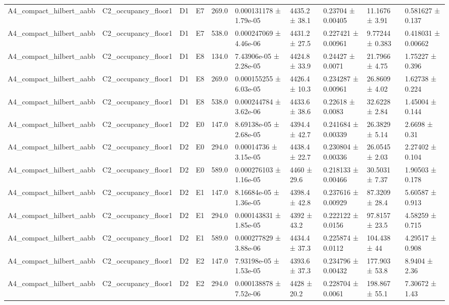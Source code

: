 \begin{table}
\begin{tabular}{llllllllll}
A4\_compact\_hilbert\_aabb & C2\_occupancy\_floor1 & D1 & E7 & 269.0 & 0.000131178 ± 1.79e-05 & 4435.2 ± 38.1 & 0.23704 ± 0.00405 & 11.1676 ± 3.91 & 0.581627 ± 0.137 \\
A4\_compact\_hilbert\_aabb & C2\_occupancy\_floor1 & D1 & E7 & 538.0 & 0.000247069 ± 4.46e-06 & 4431.2 ± 27.5 & 0.227421 ± 0.00961 & 9.77244 ± 0.383 & 0.418031 ± 0.00662 \\
A4\_compact\_hilbert\_aabb & C2\_occupancy\_floor1 & D1 & E8 & 134.0 & 7.43906e-05 ± 2.28e-05 & 4424.8 ± 33.9 & 0.24427 ± 0.0071 & 21.7966 ± 4.75 & 1.75227 ± 0.396 \\
A4\_compact\_hilbert\_aabb & C2\_occupancy\_floor1 & D1 & E8 & 269.0 & 0.000155255 ± 6.03e-05 & 4426.4 ± 10.3 & 0.234287 ± 0.00961 & 26.8609 ± 4.02 & 1.62738 ± 0.224 \\
A4\_compact\_hilbert\_aabb & C2\_occupancy\_floor1 & D1 & E8 & 538.0 & 0.000244784 ± 3.62e-06 & 4433.6 ± 38.6 & 0.22618 ± 0.0083 & 32.6228 ± 2.84 & 1.45004 ± 0.144 \\
A4\_compact\_hilbert\_aabb & C2\_occupancy\_floor1 & D2 & E0 & 147.0 & 8.69138e-05 ± 2.68e-05 & 4394.4 ± 42.7 & 0.241684 ± 0.00339 & 26.3829 ± 5.14 & 2.6698 ± 0.31 \\
A4\_compact\_hilbert\_aabb & C2\_occupancy\_floor1 & D2 & E0 & 294.0 & 0.00014736 ± 3.15e-05 & 4438.4 ± 22.7 & 0.230804 ± 0.00336 & 26.0545 ± 2.03 & 2.27402 ± 0.104 \\
A4\_compact\_hilbert\_aabb & C2\_occupancy\_floor1 & D2 & E0 & 589.0 & 0.000276103 ± 1.16e-05 & 4460 ± 29.6 & 0.218133 ± 0.00466 & 30.5031 ± 7.37 & 1.90503 ± 0.178 \\
A4\_compact\_hilbert\_aabb & C2\_occupancy\_floor1 & D2 & E1 & 147.0 & 8.16684e-05 ± 1.36e-05 & 4398.4 ± 42.8 & 0.237616 ± 0.00929 & 87.3209 ± 28.4 & 5.60587 ± 0.913 \\
A4\_compact\_hilbert\_aabb & C2\_occupancy\_floor1 & D2 & E1 & 294.0 & 0.000143831 ± 1.85e-05 & 4392 ± 43.2 & 0.222122 ± 0.0156 & 97.8157 ± 23.5 & 4.58259 ± 0.715 \\
A4\_compact\_hilbert\_aabb & C2\_occupancy\_floor1 & D2 & E1 & 589.0 & 0.000277829 ± 3.88e-06 & 4434.4 ± 37.3 & 0.225874 ± 0.0112 & 104.438 ± 44 & 4.29517 ± 0.908 \\
A4\_compact\_hilbert\_aabb & C2\_occupancy\_floor1 & D2 & E2 & 147.0 & 7.93198e-05 ± 1.53e-05 & 4393.6 ± 37.3 & 0.234796 ± 0.00432 & 177.903 ± 53.8 & 8.9404 ± 2.36 \\
A4\_compact\_hilbert\_aabb & C2\_occupancy\_floor1 & D2 & E2 & 294.0 & 0.000138878 ± 7.52e-06 & 4428 ± 20.2 & 0.228704 ± 0.0061 & 198.867 ± 55.1 & 7.30672 ± 1.43 \\

\end{tabular}
\end{table}
